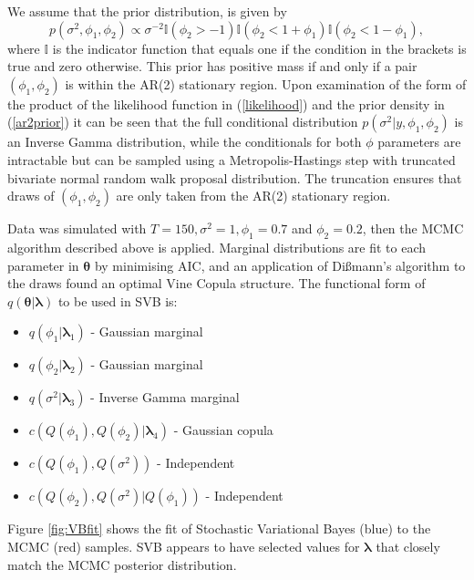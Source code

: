 \documentclass[12pt,a4paper]{article}%
\numberwithin{equation}{section}
\begin{document}
We assume that the prior distribution, is given by
\begin{equation}
p(\sigma^2, \phi_1, \phi_2) \propto \sigma^{-2} \mathbb{I}(\phi_2 > -1)\mathbb{I}(\phi_2 < 1 + \phi_1) \mathbb{I}(\phi_2 < 1 - \phi_1), 
\label{ar2prior}
\end{equation}
where $\mathbb{I}$ is the indicator function that equals one if the condition in the brackets is true and zero otherwise. This prior has positive mass if and only if a pair $(\phi_1, \phi_2)$ is within the AR(2) stationary region. Upon examination of the form of the product of the likelihood function in (\ref{likelihood}) and the prior density in (\ref{ar2prior}) it can be seen that the full conditional distribution $p(\sigma^2 | y, \phi_1, \phi_2)$ is an Inverse Gamma distribution, while the conditionals for both $\phi$ parameters are intractable but can be sampled using a Metropolis-Hastings step with truncated bivariate normal random walk proposal distribution. The truncation ensures that draws of $(\phi_1,\phi_2)$ are only taken from the AR(2) stationary region. 

Data was simulated with $T = 150, \sigma^2 = 1, \phi_1 = 0.7$ and $\phi_2 = 0.2$, then the MCMC algorithm described above is applied. Marginal distributions are fit to each parameter in $\boldsymbol{\theta}$ by minimising AIC, and an application of Di{\ss}mann's algorithm to the draws found an optimal Vine Copula structure. The functional form of $q(\boldsymbol{\theta} | \boldsymbol{\lambda})$ to be used in SVB is:
\begin{itemize}
\item $q(\phi_1 | \boldsymbol{\lambda}_1)$ - Gaussian marginal
\item $q(\phi_2| \boldsymbol{\lambda}_2)$ - Gaussian marginal
\item $q(\sigma^2| \boldsymbol{\lambda}_3)$ - Inverse Gamma marginal
\item $c(Q(\phi_1), Q(\phi_2) | \boldsymbol{\lambda}_4)$ - Gaussian copula
\item $c(Q(\phi_1), Q(\sigma^2))$ - Independent
\item $c(Q(\phi_2), Q(\sigma^2) | Q(\phi_1))$ - Independent
\end{itemize}

Figure \ref{fig:VBfit} shows the fit of Stochastic Variational Bayes (blue) to the MCMC (red) samples. SVB appears to have selected values for $\boldsymbol{\lambda}$ that closely match the MCMC posterior distribution. 
\end{document}
